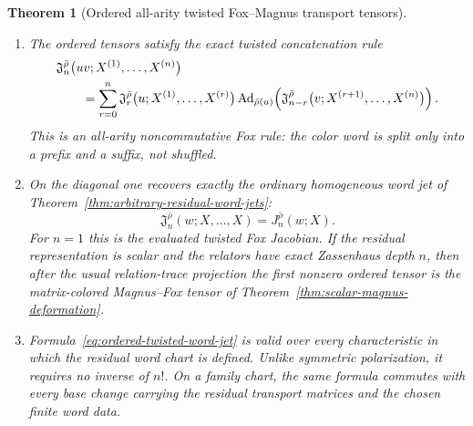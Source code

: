 \documentclass[11pt]{article}
\newtheorem{theorem}{Theorem}[section]
\theoremstyle{definition}
\begin{document}
\begin{theorem}[Ordered all-arity twisted Fox--Magnus transport tensors]
\begin{enumerate}[label=\textnormal{(\roman*)}]
\item The ordered tensors satisfy the exact twisted concatenation rule
\begin{align}
 &\mathfrak J_n^{\bar\rho}
 \bigl(uv;X^{(1)},\ldots,X^{(n)}\bigr)
 \notag\\
 &\qquad=
 \sum_{r=0}^n
 \mathfrak J_r^{\bar\rho}
 \bigl(u;X^{(1)},\ldots,X^{(r)}\bigr)
 \operatorname{Ad}_{\bar\rho(u)}\!\left(
 \mathfrak J_{n-r}^{\bar\rho}
 \bigl(v;X^{(r+1)},\ldots,X^{(n)}\bigr)
 \right).
 \label{eq:ordered-twisted-concatenation}
\end{align}
This is an all-arity noncommutative Fox rule: the color word is split only
into a prefix and a suffix, not shuffled.

\item On the diagonal one recovers exactly the ordinary homogeneous word jet
of Theorem~\ref{thm:arbitrary-residual-word-jets}:
\begin{equation}\label{eq:ordered-diagonal-recovers-word-jet}
 \mathfrak J_n^{\bar\rho}(w;X,\ldots,X)
 =J_n^{\bar\rho}(w;X).
\end{equation}
For $n=1$ this is the evaluated twisted Fox Jacobian.  If the residual
representation is scalar and the relators have exact Zassenhaus depth $n$,
then after the usual relation-trace projection the first nonzero ordered
tensor is the matrix-colored Magnus--Fox tensor of
Theorem~\ref{thm:scalar-magnus-deformation}.

\item Formula~\eqref{eq:ordered-twisted-word-jet} is valid over every
characteristic in which the residual word chart is defined.  Unlike symmetric
polarization, it requires no inverse of $n!$.  On a family chart, the same
formula commutes with every base change carrying the residual transport
matrices and the chosen finite word data.
\end{enumerate}
\end{theorem}
\end{document}
